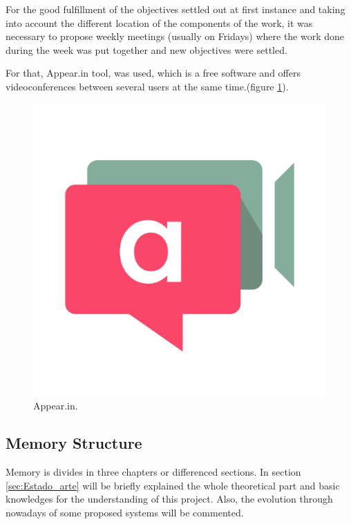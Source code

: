 For the good fulfillment of the objectives settled out at first instance and taking into account the different location of the components of the work, it was necessary to propose weekly meetings (usually on Fridays) where the work done during the week was put together and new objectives were settled. \newline

For that, Appear.in\cite{Appear} tool, was used, which is a free software and offers videoconferences between several users at the same time.(figure \ref{fig:appear}). 

\begin{figure}[H]
	\center
	\includegraphics[trim = 0mm 0mm 0mm 0mm, clip,scale=0.3]{imagenes/Introduction/appear}
	\caption{Appear.in.}
	\label{fig:appear}
\end{figure}

\subsection{Memory Structure}

Memory is divides in three chapters or differenced sections. \newline
In section \ref{sec:Estado_arte} will be briefly explained the whole theoretical part and basic knowledges for the understanding of this project. Also, the evolution through nowadays of some proposed systems will be commented.\newline

